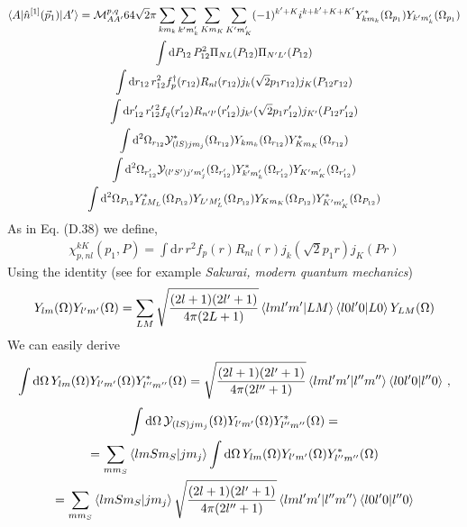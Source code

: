\documentclass[10pt]{article}
\begin{document}
\begin{multline*}
\braket{ A | \hat{n}^{[1]}(\vec{p}_1) | A'} = \mathcal{M}_{A A'}^{p,q} 64 \sqrt{2} \pi \sum_{k m_k} \sum_{k' m_k'} \sum_{K m_K} \sum_{K' m_K'} (-1)^{k'+K} i^{k+k'+K+K'} Y_{k m_k}^{*}(\Omega_{p_1}) Y_{k' m_k'}(\Omega_{p_1}) \\
 \int \text{d} P_{12} \, P_{12}^{2} \Pi_{N L}(P_{12}) \Pi_{N' L'}(P_{12})\\
 \int \text{d} r_{12}\, r_{12}^{2} f_{p}^{\dagger}(r_{12}) R_{n l}(r_{12}) j_{k}( \sqrt{2} p_1 r_{12})  j_{K}(P_{12} r_{12}) \\
\int \text{d} r_{12}' \, r_{12}^{\prime \, 2} f_{q}(r_{12}')  R_{n' l'}(r_{12}') j_{k'}( \sqrt{2} p_1 r_{12}')  j_{K'}(P_{12} r_{12}') \\
 \int \text{d}^{2} \Omega_{r_{12}}  \mathcal{Y}_{(lS)jm_j}^{*}(\Omega_{r_{12}}) Y_{k m_k}(\Omega_{r_{12}}) Y_{K m_K}^{*}(\Omega_{r_{12}}) \\
 \int \text{d}^{2} \Omega_{r_{12}'}  \mathcal{Y}_{(l'S')j'm_j'}(\Omega_{r_{12}'})  Y_{k' m_k'}^{*}(\Omega_{r_{12}'}) Y_{K' m_K'}(\Omega_{r_{12}'}) \\
   \int \text{d}^{2} \Omega_{P_{12}}  Y_{L M_L}^{*}(\Omega_{P_{12}})  Y_{L' M_L'}(\Omega_{P_{12}}) Y_{K m_K}(\Omega_{P_{12}}) Y_{K' m_K'}^{*}(\Omega_{P_{12}}) \\
\end{multline*}
As in Eq. (D.38) we define,
\begin{align*}
	\chi_{p,nl}^{kK}(p_1,P) = \int \text{d} r\, r^{2} f_{p}(r) R_{n l}(r) j_{k}( \sqrt{2} p_1 r)  j_{K}(P r)
\end{align*}
Using the identity (see for example \textit{Sakurai, modern quantum mechanics})
\begin{align*}
	Y_{ l m }(\Omega) Y_{ l' m'}(\Omega) = \sum_{LM} \sqrt{ \frac{(2l+1)(2l'+1)}{4 \pi (2L+1)}} \braket{ l m l' m' | L M} \braket{ l 0 l' 0 | L 0 } Y_{L M}(\Omega)
\end{align*}
We can easily derive
\begin{align*}
	\int \text{d} \Omega \, Y_{ l m }(\Omega) Y_{ l' m'}(\Omega) Y_{ l'' m''}^{*}(\Omega) = \sqrt{ \frac{(2l+1)(2l'+1)}{4 \pi (2l''+1)}} \braket{ l m l' m' | l'' m''} \braket{ l 0 l' 0 | l'' 0 } \, ,
\end{align*}
\begin{multline*}
	\int \text{d} \Omega \, \mathcal{Y}_{ (l S) j m_j }(\Omega) Y_{ l' m'}(\Omega) Y_{ l'' m''}^{*}(\Omega) = \\
	= \sum_{m m_S} \braket{ l m S m_S | j m_j} \int \text{d} \Omega \, Y_{ l m }(\Omega) Y_{ l' m'}(\Omega) Y_{ l'' m''}^{*}(\Omega) \\
	= \sum_{m m_S} \braket{ l m S m_S | j m_j} \sqrt{ \frac{(2l+1)(2l'+1)}{4 \pi (2l''+1)}} \braket{ l m l' m' | l'' m''} \braket{ l 0 l' 0 | l'' 0 }
\end{multline*}
\end{document}
